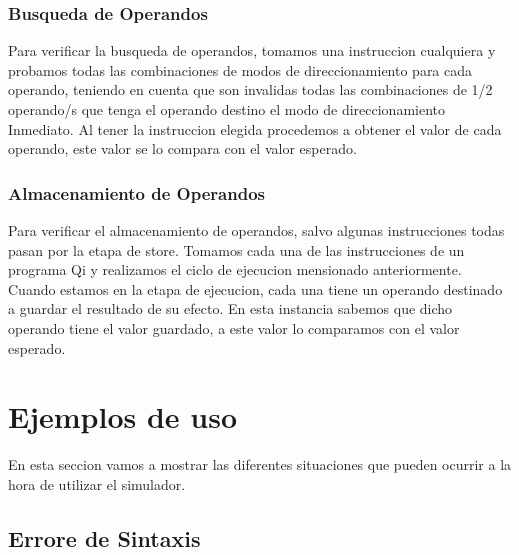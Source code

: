 \subsubsection{Busqueda de Operandos}

Para verificar la busqueda de operandos, tomamos una instruccion cualquiera y probamos todas las combinaciones de modos de direccionamiento para cada operando, teniendo en cuenta que son invalidas todas las combinaciones de 1/2 operando/s que tenga el operando destino el modo de direccionamiento Inmediato. Al tener la instruccion elegida procedemos a obtener el valor de cada operando, este valor se lo compara con el valor esperado. 
 
\subsubsection{Almacenamiento de Operandos}

Para verificar el almacenamiento de operandos, salvo algunas instrucciones todas pasan por la etapa de store.
Tomamos cada una de las instrucciones de un programa Qi y realizamos el ciclo de ejecucion mensionado anteriormente.
Cuando estamos en la etapa de ejecucion, cada una tiene un operando destinado a guardar el resultado de su efecto.
En esta instancia sabemos que  dicho operando tiene el valor guardado, a este valor lo comparamos con el valor esperado.

\section{Ejemplos de uso}

En esta seccion vamos a mostrar las diferentes situaciones que pueden ocurrir a la hora de utilizar el simulador.

\subsection{Errore de Sintaxis} 

